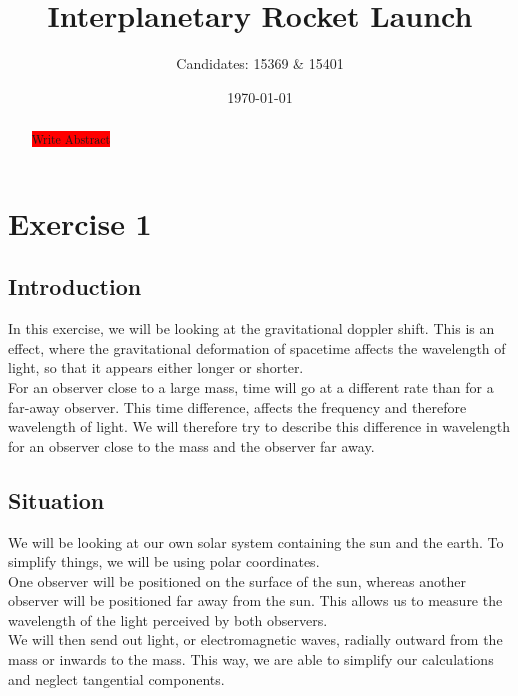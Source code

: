 \documentclass[reprint,english,notitlepage]{revtex4-2}
\begin{document}
\title{Interplanetary Rocket Launch}
\author{Candidates: 15369 \& 15401}
\date{\today}

\begin{abstract}
    \colorbox{red}{Write Abstract}
\end{abstract}
\maketitle

\section{Exercise 1}\label{sec:exercise-1}
    \subsection{Introduction}\label{subsec:introduction1}
        In this exercise, we will be looking at the gravitational doppler shift.
        This is an effect, where the gravitational deformation of spacetime affects the wavelength of light, so that it appears either longer or shorter.\\
        For an observer close to a large mass, time will go at a different rate than for a far-away observer.
        This time difference, affects the frequency and therefore wavelength of light.
        We will therefore try to describe this difference in wavelength for an observer close to the mass and the observer far away.

    \subsection{Situation}\label{subsec:situation1}
        We will be looking at our own solar system containing the sun and the earth.
        To simplify things, we will be using polar coordinates.\\
        One observer will be positioned on the surface of the sun, whereas another observer will be positioned far away from the sun.
        This allows us to measure the wavelength of the light perceived by both observers.\\
        We will then send out light, or electromagnetic waves, radially outward from the mass or inwards to the mass.
        This way, we are able to simplify our calculations and neglect tangential components.
\end{document}
